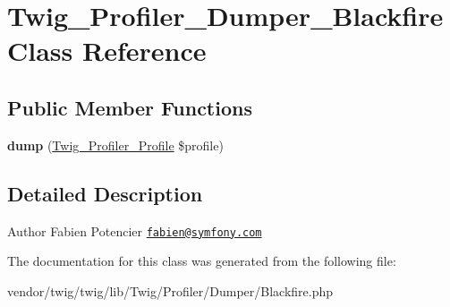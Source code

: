 \hypertarget{classTwig__Profiler__Dumper__Blackfire}{}\section{Twig\+\_\+\+Profiler\+\_\+\+Dumper\+\_\+\+Blackfire Class Reference}
\label{classTwig__Profiler__Dumper__Blackfire}
\subsection*{Public Member Functions}
\begin{DoxyCompactItemize}
\item 
{\bfseries dump} (\hyperlink{classTwig__Profiler__Profile}{Twig\+\_\+\+Profiler\+\_\+\+Profile} \$profile)\hypertarget{classTwig__Profiler__Dumper__Blackfire_a54a7dbe911bbf7a913759384575e1622}{}\label{classTwig__Profiler__Dumper__Blackfire_a54a7dbe911bbf7a913759384575e1622}

\end{DoxyCompactItemize}


\subsection{Detailed Description}
\begin{DoxyAuthor}{Author}
Fabien Potencier \href{mailto:fabien@symfony.com}{\tt fabien@symfony.\+com} 
\end{DoxyAuthor}


The documentation for this class was generated from the following file\+:\begin{DoxyCompactItemize}
\item 
vendor/twig/twig/lib/\+Twig/\+Profiler/\+Dumper/Blackfire.\+php\end{DoxyCompactItemize}
